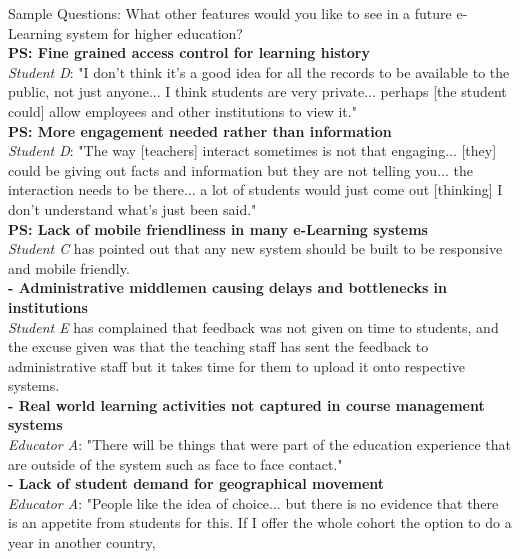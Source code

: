 Sample Questions: What other features would you like to see in a future e-Learning system for 
higher education?
\vspace{0.25cm}\\
\textbf{PS: Fine grained access control for learning history}\\
\textit{Student D}: "I don't think it's a good idea for all the records to be available to the public, 
not just anyone... I think students are very private... perhaps [the student could] allow employees and 
other institutions to view it."
\vspace{0.25cm}\\
\textbf{PS: More engagement needed rather than information}\\
\textit{Student D}: "The way [teachers] interact sometimes is not that engaging... [they] could be 
giving out facts and information but they are not telling you... the interaction needs to be 
there... a lot of students would just come out [thinking] I don't understand what's just been said."
\vspace{0.25cm}\\
\textbf{PS: Lack of mobile friendliness in many e-Learning systems}\\
\textit{Student C} has pointed out that any new system should be built to be responsive and mobile friendly.
\vspace{0.25cm}\\
\textbf{- Administrative middlemen causing delays and bottlenecks in institutions}\\
\textit{Student E} has complained that feedback was not given on time to students, and the excuse 
given was that the teaching staff has sent the feedback to administrative staff but it takes time for 
them to upload it onto respective systems.
\vspace{0.25cm}\\
\textbf{- Real world learning activities not captured in course management systems}\\
\textit{Educator A}: "There will be things that were part of the education experience that are outside of the system
such as face to face contact."
\vspace{0.25cm}\\
\textbf{- Lack of student demand for geographical movement}\\
\textit{Educator A}: "People like the idea of choice... but there is no evidence that there is an appetite 
from students for this. If I offer the whole cohort the option to do a year in another country,
